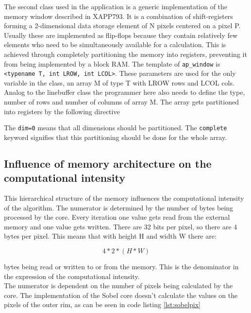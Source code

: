 The second class used in the application is a generic implementation of the memory window described in XAPP793. It is a combination of shift-registers forming a 2-dimensional data storage element of N pixels centered on a pixel P. Usually these are implemented as flip-flops because they contain relatively few elements who need to be simultaneously available for a calculation. This is achieved through completely partitioning the memory into registers, preventing it from being implemented by a block RAM.
The template of \texttt{ap\_window} is \texttt{<typename T, int LROW, int LCOL>}. These parameters are used for the only variable in the class, an array M of type T with LROW rows and LCOL cols. Analog to the linebuffer class the programmer here also needs to define the type, number of rows and number of columns of array M. The array gets partitioned into registers by the following directive




The \texttt{dim=0} means that all dimensions should be partitioned. The \texttt{complete} keyword signifies that this partitioning should be done for the whole array.


\subsection{Influence of memory architecture on the computational intensity}

This hierarchical structure of the memory influences the computational intensity of the algorithm. The numerator is determined by the number of bytes being processed by the core. Every iteration one value gets read from the external memory and one value gets written.  There are 32 bits per pixel, so there are 4 bytes per pixel. This means that with height H and width W there are:

\begin{equation} \label{eq:orig_den}
4 * 2 * ( H * W )
\end{equation}

bytes being read or written to or from the memory. This is the denominator in the expression of the computational intensity.\\
The numerator is dependent on the number of pixels being calculated by the core. The implementation of the Sobel core doesn't calculate the values on the pixels of the outer rim, as can be seen in code listing \ref{lst:sobelpix}

